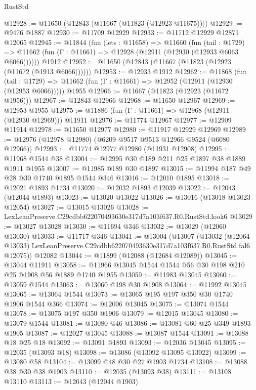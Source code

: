 \begin{lexlean}{RustStd}
\begin{coremodule}
@12928 := @11650 (@12843 (@11667 (@11823 (@12923 @11675))))
@12929 := @9476 @1887
@12930 := @11709 @12929
@12933 := @11712 @12929 @12871 @12065
@12945 := @11844
    (fun (lets : @11658) =>
    @11660
      (fun (tail : @1729) =>
      @11662 (fun (Γ : @11661) => @12928 (@12911 (@12930 (@12933 @6063 @6066))))))
    @1912
@12952 := @11650 (@12843 (@11667 (@11823 (@12923 (@11672 (@1913 @6066))))))
@12953 := @12933 @1912
@12962 := @11868
    (fun (tail : @1729) => @11662 (fun (Γ : @11661) => @12952 (@12911 (@12930 (@12953 @6066)))))
    @1955
@12966 := @11667 (@11823 (@12923 (@11672 @1956)))
@12967 := @12843 @12966
@12968 := @11650 @12967
@12969 := @12953 @1955
@12975 := @11886 (fun (Γ : @11661) => @12968 (@12911 (@12930 @12969))) @11911
@12976 := @11774 @12967
@12977 := @12909 @11914
@12978 := @11650 @12977
@12980 := @11917 @12929 @12969
@12989 := @12976 (@12978 @12980) (@6209 @9517 @9513 @12966 @9524 (@6080 @12966))
@12993 := @11774 @12977 @12980 (@11931 @12908)
@12995 := @11968 @1544 @38
@13004 := @12995 @30 @189 @211 @25 @1897 @38 @1889 @1911 @1955
@13007 := @11985 @189 @30 @1897
@13015 := @11994 @187 @49 @28 @30 @1740 @1895 @1544 @346
@13016 := @12010 @1895
@13018 := @12021 @1893 @1734
@13020 := @12032 @1893 @12039
@13022 := @12043 (@12044 @1893)
@13023 := @13020 @13022
@13026 := @13016 (@13018 @13023 @12054)
@13027 := @13015 @13026
@13028 := LexLeanPreserve.C29cdbb622070493630e317d7a103f637.R0.RustStd.look6
@13029 := @13027 @13028
@13030 := @11694 @346
@13032 := @13029 (@12060 @13030)
@13033 := @11717 @346
@13041 := @13004
    (@13007
      (@13032
        (@12064 @13033)
        LexLeanPreserve.C29cdbb622070493630e317d7a103f637.R0.RustStd.fal6
        @12075))
    @12082
@13044 := @11899 (@12088 (@12684 @12089))
@13045 := @13044 @11911
@13058 := @11966 @13045 @1544 @1544 @56 @30 @198 @210 @25 @1908 @56 @1889 @1740 @1955
@13059 := @11983 @13045
@13060 := @13059 @1544
@13063 := @13060 @198 @30 @1908
@13064 := @11992 @13045
@13065 := @13064 @1544
@13073 := @13065 @195 @197 @350 @30 @1740 @1906 @1544 @366
@13074 := @12006 @13045
@13075 := @13074 @1544
@13078 := @13075 @197 @350 @1906
@13079 := @12015 @13045
@13080 := @13079 @1544
@13081 := @13080 @46
@13086 := @13081 @60 @25 @349 @1893 @1905
@13087 := @12027 @13045
@13088 := @13087 @1544
@13091 := @13088 @18 @25 @18
@13092 := @13091 @1893
@13093 := @12036 @13045
@13095 := @12035 (@13093 @18)
@13098 := @13086 (@13092 @13095 @13022)
@13099 := @13080 @58
@13104 := @13099 @48 @30 @27 @1903 @1734
@13108 := @13088 @38 @30 @38 @1903
@13110 := @12035 (@13093 @38)
@13111 := @13108 @13110
@13113 := @12043 (@12044 @1903)

\end{coremodule}
\end{lexlean}

